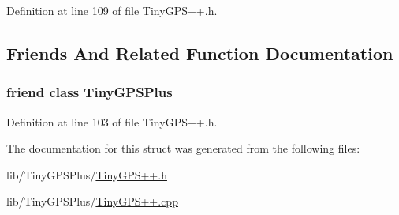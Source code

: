 Definition at line 109 of file Tiny\+G\+P\+S++.\+h.



\subsection{Friends And Related Function Documentation}
\subsubsection[{\texorpdfstring{Tiny\+G\+P\+S\+Plus}{TinyGPSPlus}}]{\setlength{\rightskip}{0pt plus 5cm}friend class {\bf Tiny\+G\+P\+S\+Plus}\hspace{0.3cm}{\ttfamily [friend]}}\hypertarget{struct_tiny_g_p_s_time_a6501fd5ef19ae166d43e0e5781609ee2}{}\label{struct_tiny_g_p_s_time_a6501fd5ef19ae166d43e0e5781609ee2}


Definition at line 103 of file Tiny\+G\+P\+S++.\+h.



The documentation for this struct was generated from the following files\+:\begin{DoxyCompactItemize}
\item 
lib/\+Tiny\+G\+P\+S\+Plus/\hyperlink{_tiny_g_p_s_09_09_8h}{Tiny\+G\+P\+S++.\+h}\item 
lib/\+Tiny\+G\+P\+S\+Plus/\hyperlink{_tiny_g_p_s_09_09_8cpp}{Tiny\+G\+P\+S++.\+cpp}\end{DoxyCompactItemize}

